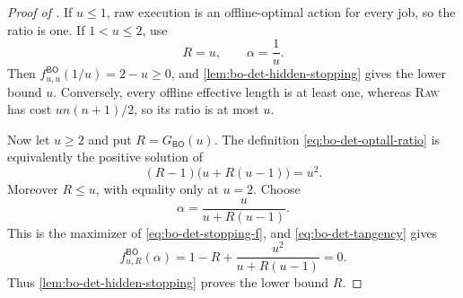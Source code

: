 \begin{proof}[Proof of ]
If $u\le1$, raw execution is an offline-optimal action for every job, so the
ratio is one.  If $1<u\le2$, use
\begin{equation}
 R=u,
 \qquad \alpha=\frac1u.
\end{equation}
Then
$f^{\mathsf{BO}}_{u,u}(1/u)=2-u\ge0$, and
\cref{lem:bo-det-hidden-stopping} gives the lower bound $u$.  Conversely,
every offline effective length is at least one, whereas \textsc{Raw} has
cost $u n(n+1)/2$, so its ratio is at most $u$.

Now let $u\ge2$ and put $R=G_{\mathsf{BO}}(u)$.  The definition
\eqref{eq:bo-det-optall-ratio} is equivalently the positive solution of
\begin{equation}
 (R-1)\bigl(u+R(u-1)\bigr)=u^2.
 \label{eq:bo-det-tangency}
\end{equation}
Moreover $R\le u$, with equality only at $u=2$.  Choose
\begin{equation}
 \alpha=\frac{u}{u+R(u-1)}.
 \label{eq:bo-det-alpha}
\end{equation}
This is the maximizer of \cref{eq:bo-det-stopping-f}, and
\eqref{eq:bo-det-tangency} gives
\begin{equation}
 f^{\mathsf{BO}}_{u,R}(\alpha)
 =1-R+\frac{u^2}{u+R(u-1)}=0.
\end{equation}
Thus \cref{lem:bo-det-hidden-stopping} proves the lower bound $R$.


\end{proof}
